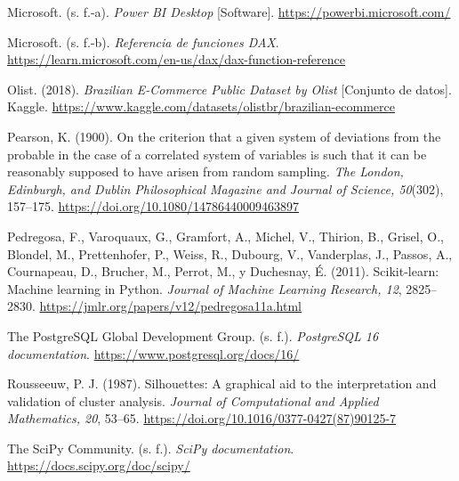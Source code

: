 \documentclass[a4paper,stu,12pt,donotrepeattitle,floatsintext]{apa7}
\begin{document}
{\hangindent=0.5in\noindent Microsoft. (s. f.-a). \emph{Power BI Desktop} [Software]. \url{https://powerbi.microsoft.com/}\par}

{\hangindent=0.5in\noindent Microsoft. (s. f.-b). \emph{Referencia de funciones DAX}. \url{https://learn.microsoft.com/en-us/dax/dax-function-reference}\par}

{\hangindent=0.5in\noindent Olist. (2018). \emph{Brazilian E-Commerce Public Dataset by Olist} [Conjunto de datos]. Kaggle. \url{https://www.kaggle.com/datasets/olistbr/brazilian-ecommerce}\par}

{\hangindent=0.5in\noindent Pearson, K. (1900). On the criterion that a given system of deviations from the probable in the case of a correlated system of variables is such that it can be reasonably supposed to have arisen from random sampling. \emph{The London, Edinburgh, and Dublin Philosophical Magazine and Journal of Science, 50}(302), 157--175. \url{https://doi.org/10.1080/14786440009463897}\par}

{\hangindent=0.5in\noindent Pedregosa, F., Varoquaux, G., Gramfort, A., Michel, V., Thirion, B., Grisel, O., Blondel, M., Prettenhofer, P., Weiss, R., Dubourg, V., Vanderplas, J., Passos, A., Cournapeau, D., Brucher, M., Perrot, M., y Duchesnay, É. (2011). Scikit-learn: Machine learning in Python. \emph{Journal of Machine Learning Research, 12}, 2825--2830. \url{https://jmlr.org/papers/v12/pedregosa11a.html}\par}

{\hangindent=0.5in\noindent The PostgreSQL Global Development Group. (s. f.). \emph{PostgreSQL 16 documentation}. \url{https://www.postgresql.org/docs/16/}\par}

{\hangindent=0.5in\noindent Rousseeuw, P. J. (1987). Silhouettes: A graphical aid to the interpretation and validation of cluster analysis. \emph{Journal of Computational and Applied Mathematics, 20}, 53--65. \url{https://doi.org/10.1016/0377-0427(87)90125-7}\par}

{\hangindent=0.5in\noindent The SciPy Community. (s. f.). \emph{SciPy documentation}. \url{https://docs.scipy.org/doc/scipy/}\par}
\end{document}
